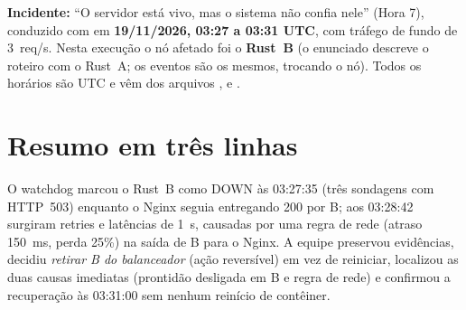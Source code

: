 \documentclass[10pt,a4paper]{article}
\begin{document}

\textbf{Incidente:} ``O servidor está vivo, mas o sistema não confia nele'' (Hora 7), conduzido com  em
\textbf{19/11/2026, 03:27 a 03:31 UTC}, com tráfego de fundo de 3~req/s. Nesta execução o nó afetado foi o \textbf{Rust~B} (o enunciado
descreve o roteiro com o Rust~A; os eventos são os mesmos, trocando o nó). Todos os horários são UTC e vêm dos arquivos
,  e .

\section{Resumo em três linhas}
O watchdog marcou o Rust~B como DOWN às 03:27:35 (três sondagens  com HTTP~503) enquanto o Nginx seguia entregando 200 por B;
aos 03:28:42 surgiram retries e latências de 1~s, causadas por uma regra de rede (atraso 150~ms, perda 25\%) na saída de B para o Nginx.
A equipe preservou evidências, decidiu \emph{retirar B do balanceador} (ação reversível) em vez de reiniciar, localizou as duas causas imediatas
(prontidão desligada em B e regra de rede) e confirmou a recuperação às 03:31:00 sem nenhum reinício de contêiner.
\end{document}

